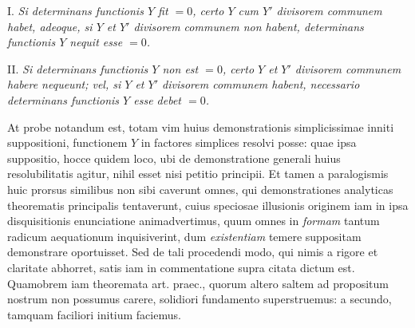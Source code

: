 I. \textit{Si determinans functionis $Y$ fit $=0$, certo $Y$ cum $Y'$ divisorem communem habet, adeoque, si $Y$ et $Y'$ divisorem communem non habent, determinans functionis $Y$ nequit esse $=0$.}

II. \textit{Si determinans functionis $Y$ non est $=0$, certo $Y$ et $Y'$ divisorem communem habere nequeunt; vel, si $Y$ et $Y'$ divisorem communem habent, necessario determinans functionis $Y$ esse debet $=0$.}

At probe notandum est, totam vim huius demonstrationis simplicissimae inniti suppositioni, functionem $Y$ in factores simplices resolvi posse: quae ipsa suppositio, hocce quidem loco, ubi de demonstratione generali huius resolubilitatis
agitur, nihil esset nisi petitio principii. Et tamen a paralogismis huic prorsus similibus non sibi caverunt omnes, qui demonstrationes analyticas theorematis principalis tentaverunt, cuius speciosae illusionis originem iam in ipsa disquisitionis
enunciatione animadvertimus, quum omnes in \textit{formam} tantum radicum aequationum inquisiverint, dum \textit{existentiam} temere suppositam demonstrare oportuisset.
Sed de tali procedendi modo, qui nimis a rigore et claritate abhorret, satis iam in
commentatione supra citata dictum est. Quamobrem iam theoremata art. praec.,
quorum altero saltem ad propositum nostrum non possumus carere, solidiori fundamento superstruemus: a secundo, tamquam faciliori initium faciemus.

